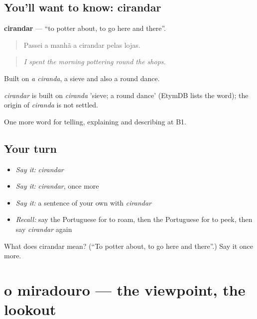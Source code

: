 \subsection*{You'll want to know: cirandar}
\textbf{cirandar} — \textquotedblleft{}to potter about, to go here and there\textquotedblright{}.

\begin{quote}
Passei a manhã a cirandar pelas lojas.
\end{quote}

\begin{quote}
\emph{I spent the morning pottering round the shops.}
\end{quote}

Built on \emph{a ciranda}, a sieve and also a round dance.

\begin{cousinweb}
\emph{cirandar} is built on \emph{ciranda} 'sieve; a round dance' (EtymDB lists the word); the origin of \emph{ciranda} is not settled.
\end{cousinweb}

\begin{grammarlens}[title={What you've built}]
One more word for telling, explaining and describing at B1.
\end{grammarlens}

\subsection*{Your turn}
\begin{itemize}
\raggedright
  \item \emph{Say it:} \emph{cirandar}
  \item \emph{Say it:} \emph{cirandar}, once more
  \item \emph{Say it:} a sentence of your own with \emph{cirandar}
  \item \emph{Recall:} say the Portuguese for to roam, then the Portuguese for to peek, then say \emph{cirandar} again
\end{itemize}

\begin{tcolorbox}[breakable,colback=teal!4,colframe=teal!35!black,title={Before you move on}]
What does cirandar mean? (\textquotedblleft{}To potter about, to go here and there\textquotedblright{}.) Say it once more.
\end{tcolorbox}
\section[o miradouro]{o miradouro — the viewpoint, the lookout}

